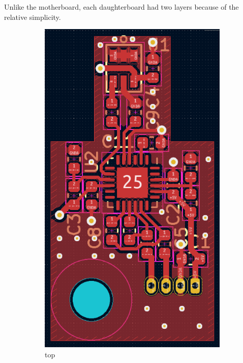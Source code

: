 \documentclass[notitlepage]{report}
\begin{document}
Unlike the motherboard, each daughterboard had two layers because of the relative simplicity.

\begin{figure}[H]
\begin{subfigure}{0.5\textwidth}
	\includegraphics[width=.9\textwidth]{./pcb/daughter/top.png}
	\centering
	\caption{top}
	\label{fig:design_pcb_daughter_top}
	\centering
\end{subfigure}
\begin{subfigure}{0.5\textwidth}

\end{subfigure}
\end{figure}
\end{document}
